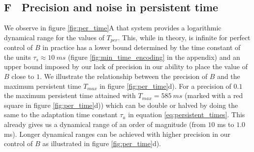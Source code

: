 \documentclass[10pt,a4paper]{article}
\begin{document}
\subsection*{F $\:$ Precision and noise in persistent time}

We observe in figure \ref{fig:per_time}A that system provides a logarithmic dynamical range for the values of $T_{per}$. This, while in theory, is infinite for perfect control of $B$ in practice has a lower bound determined by the time constant of the units $\tau_s \approx 10 \: ms$  (figure \ref{fig:min_time_encoding} in the appendix) and an upper bound imposed by our lack of precision in our ability to place the value of $B$ close to $1$.  We illustrate the relationship between the precision of $B$ and the maximum persistent time $T_{max}$ in figure \ref{fig:per_time}d). For a precision of $0.1$ the maximum persistent time attained with $T_{max} = 585 \:ms$ (marked with a red square in figure \ref{fig:per_time}d)) which can be double or halved by doing the same to the adaptation time constant $\tau_a$ in equation \ref{eq:persistent_times}. This already gives us a dynamical range of an order of magnitude (from $10$ ms to $1.0$ ms). Longer dynamical ranges can be achieved with higher precision in our control of $B$ as illustrated in figure \ref{fig:per_time}d). 



\end{document}
